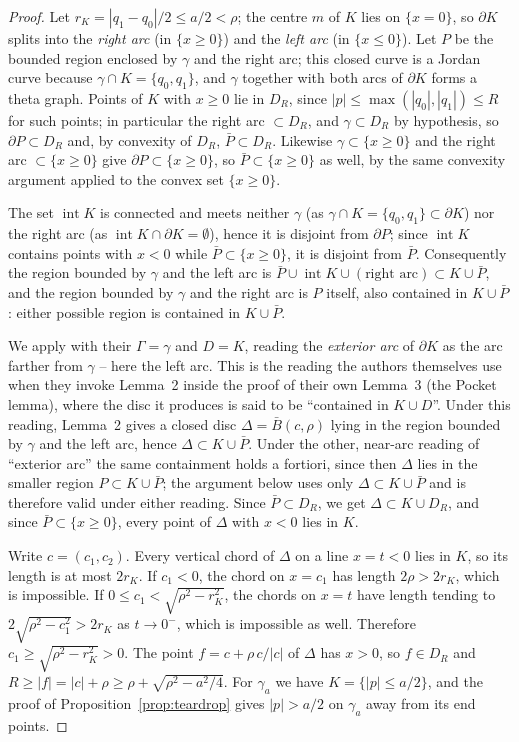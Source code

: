 \documentclass[11pt,reqno]{amsart}
\theoremstyle{definition}
\numberwithin{equation}{section}
\begin{document}
\begin{proof}
Let $r_K=|q_1-q_0|/2\le a/2<\rho$; the centre $m$ of $K$ lies on $\{x=0\}$, so $\partial K$ splits into the \emph{right arc} (in $\{x\ge0\}$) and the \emph{left arc} (in $\{x\le0\}$). Let $P$ be the bounded region enclosed by $\gamma$ and the right arc; this closed curve is a Jordan curve because $\gamma\cap K=\{q_0,q_1\}$, and $\gamma$ together with both arcs of $\partial K$ forms a theta graph. Points of $K$ with $x\ge0$ lie in $D_R$, since $|p|\le\max(|q_0|,|q_1|)\le R$ for such points; in particular the right arc $\subset D_R$, and $\gamma\subset D_R$ by hypothesis, so $\partial P\subset D_R$ and, by convexity of $D_R$, $\bar P\subset D_R$. Likewise $\gamma\subset\{x\ge0\}$ and the right arc $\subset\{x\ge0\}$ give $\partial P\subset\{x\ge0\}$, so $\bar P\subset\{x\ge0\}$ as well, by the same convexity argument applied to the convex set $\{x\ge0\}$.

The set $\operatorname{int}K$ is connected and meets neither $\gamma$ (as $\gamma\cap K=\{q_0,q_1\}\subset\partial K$) nor the right arc (as $\operatorname{int}K\cap\partial K=\emptyset$), hence it is disjoint from $\partial P$; since $\operatorname{int}K$ contains points with $x<0$ while $\bar P\subset\{x\ge0\}$, it is disjoint from $\bar P$. Consequently the region bounded by $\gamma$ and the left arc is $\bar P\cup\operatorname{int}K\cup(\text{right arc})\subset K\cup\bar P$, and the region bounded by $\gamma$ and the right arc is $P$ itself, also contained in $K\cup\bar P$: either possible region is contained in $K\cup\bar P$.

We apply \cite[Lemma~2]{ahn2012reachability} with their $\Gamma=\gamma$ and $D=K$, reading the \emph{exterior arc} of $\partial K$ as the arc farther from $\gamma$ -- here the left arc. This is the reading the authors themselves use when they invoke Lemma~2 inside the proof of their own Lemma~3 (the Pocket lemma), where the disc it produces is said to be ``contained in $K\cup D$''. Under this reading, Lemma~2 gives a closed disc $\Delta=\bar B(c,\rho)$ lying in the region bounded by $\gamma$ and the left arc, hence $\Delta\subset K\cup\bar P$. Under the other, near-arc reading of ``exterior arc'' the same containment holds a fortiori, since then $\Delta$ lies in the smaller region $P\subset K\cup\bar P$; the argument below uses only $\Delta\subset K\cup\bar P$ and is therefore valid under either reading. Since $\bar P\subset D_R$, we get $\Delta\subset K\cup D_R$, and since $\bar P\subset\{x\ge0\}$, every point of $\Delta$ with $x<0$ lies in $K$.

Write $c=(c_1,c_2)$. Every vertical chord of $\Delta$ on a line $x=t<0$ lies in $K$, so its length is at most $2r_K$. If $c_1<0$, the chord on $x=c_1$ has length $2\rho>2r_K$, which is impossible. If $0\le c_1<\sqrt{\rho^2-r_K^2}$, the chords on $x=t$ have length tending to $2\sqrt{\rho^2-c_1^2}>2r_K$ as $t\to0^-$, which is impossible as well. Therefore $c_1\ge\sqrt{\rho^2-r_K^2}>0$. The point $f=c+\rho\,c/|c|$ of $\Delta$ has $x>0$, so $f\in D_R$ and $R\ge|f|=|c|+\rho\ge\rho+\sqrt{\rho^2-a^2/4}$. For $\gamma_a$ we have $K=\{|p|\le a/2\}$, and the proof of Proposition~\ref{prop:teardrop} gives $|p|>a/2$ on $\gamma_a$ away from its end points.
\end{proof}
\end{document}
